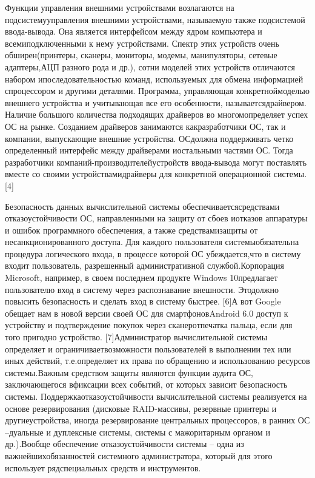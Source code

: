 Функции управления внешними устройствами возлагаются на подсистемууправления внешними устройствами, называемую также подсистемой ввода-вывода.   Она   является   интерфейсом   между   ядром   компьютера   и   всемиподключенными к нему устройствами. Спектр этих устройств очень обширен(принтеры, сканеры, мониторы, модемы, манипуляторы, сетевые адаптеры,АЦП разного рода и др.), сотни моделей этих устройств отличаются набором ипоследовательностью   команд,   используемых   для   обмена   информацией   спроцессором   и   другими   деталями.   Программа,   управляющая   конкретноймоделью внешнего устройства и учитывающая все его особенности, называетсядрайвером. Наличие большого количества подходящих драйверов во многомопределяет   успех   ОС   на   рынке.   Созданием   драйверов   занимаются   какразработчики ОС, так и компании, выпускающие внешние устройства. ОСдолжна поддерживать четко определенный интерфейс между драйверами иостальными   частями   ОС.   Тогда   разработчики   компаний-производителейустройств ввода-вывода могут поставлять вместе со своими устройствамидрайверы для конкретной операционной системы. [4]

Безопасность   данных   вычислительной   системы   обеспечиваетсясредствами отказоустойчивости ОС, направленными на защиту от сбоев иотказов аппаратуры и ошибок программного обеспечения, а также средствамизащиты от несанкционированного доступа. Для каждого пользователя системыобязательна процедура логического входа, в процессе которой ОС убеждается,что в систему входит пользователь, разрешенный административной службой.Корпорация  Microsoft, например, в своем последнем продукте  Windows  10предлагает пользователю вход в систему через распознавание внешности. Этодолжно повысить безопасность и сделать вход в систему быстрее. [6]А вот  Google  обещает нам в новой версии своей ОС для смартфоновAndroid  6.0  доступ   к   устройству  и   подтверждение   покупок   через   сканеротпечатка пальца, если для того пригодно устройство. [7]Администратор   вычислительной   системы   определяет   и   ограничиваетвозможности   пользователей   в   выполнении   тех   или   иных   действий,   т.е.определяет   их   права   по   обращению   и   использованию   ресурсов   системы.Важным средством защиты являются функции аудита ОС, заключающегося вфиксации всех событий, от которых зависит безопасность системы. Поддержкаотказоустойчивости   вычислительной   системы   реализуется   на   основе резервирования   (дисковые   RAID-массивы,   резервные   принтеры   и   другиеустройства, иногда резервирование центральных процессоров, в ранних ОС –дуальные и дуплексные системы, системы с мажоритарным органом и др.).Вообще   обеспечение   отказоустойчивости   системы   –   одна   из   важнейшихобязанностей системного администратора, который для этого использует рядспециальных средств и инструментов.~\cite{Oc2}

